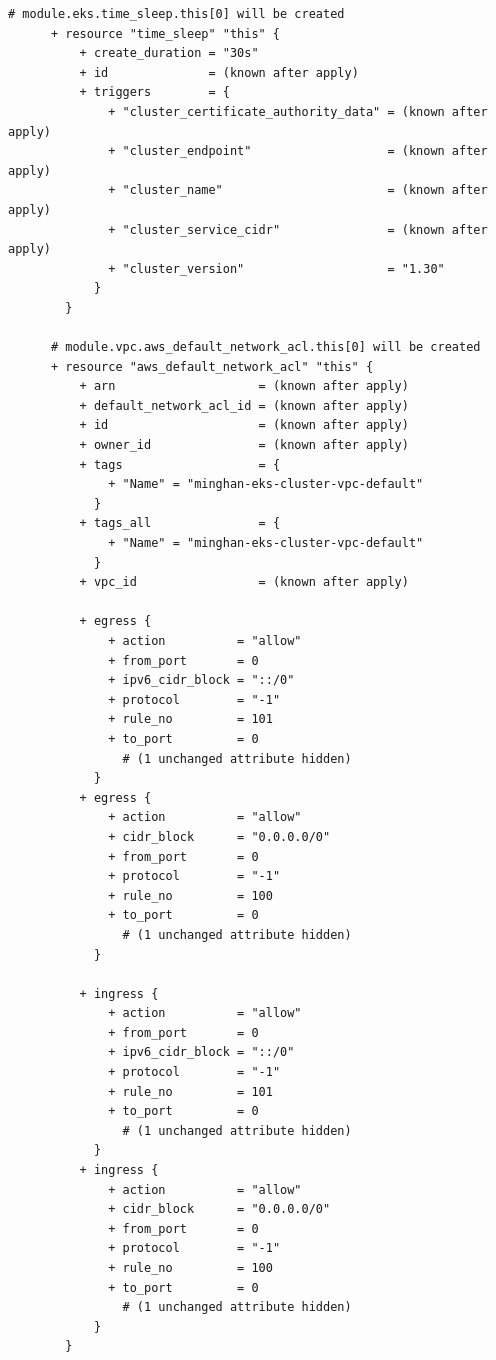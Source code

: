 \begin{lstlisting}[caption={terraform plan output for \texttt{cloudkube} provisioning}, breaklines=true, breakatwhitespace=false]
      # module.eks.time_sleep.this[0] will be created
      + resource "time_sleep" "this" {
          + create_duration = "30s"
          + id              = (known after apply)
          + triggers        = {
              + "cluster_certificate_authority_data" = (known after apply)
              + "cluster_endpoint"                   = (known after apply)
              + "cluster_name"                       = (known after apply)
              + "cluster_service_cidr"               = (known after apply)
              + "cluster_version"                    = "1.30"
            }
        }
    
      # module.vpc.aws_default_network_acl.this[0] will be created
      + resource "aws_default_network_acl" "this" {
          + arn                    = (known after apply)
          + default_network_acl_id = (known after apply)
          + id                     = (known after apply)
          + owner_id               = (known after apply)
          + tags                   = {
              + "Name" = "minghan-eks-cluster-vpc-default"
            }
          + tags_all               = {
              + "Name" = "minghan-eks-cluster-vpc-default"
            }
          + vpc_id                 = (known after apply)
    
          + egress {
              + action          = "allow"
              + from_port       = 0
              + ipv6_cidr_block = "::/0"
              + protocol        = "-1"
              + rule_no         = 101
              + to_port         = 0
                # (1 unchanged attribute hidden)
            }
          + egress {
              + action          = "allow"
              + cidr_block      = "0.0.0.0/0"
              + from_port       = 0
              + protocol        = "-1"
              + rule_no         = 100
              + to_port         = 0
                # (1 unchanged attribute hidden)
            }
    
          + ingress {
              + action          = "allow"
              + from_port       = 0
              + ipv6_cidr_block = "::/0"
              + protocol        = "-1"
              + rule_no         = 101
              + to_port         = 0
                # (1 unchanged attribute hidden)
            }
          + ingress {
              + action          = "allow"
              + cidr_block      = "0.0.0.0/0"
              + from_port       = 0
              + protocol        = "-1"
              + rule_no         = 100
              + to_port         = 0
                # (1 unchanged attribute hidden)
            }
        }
    

\end{lstlisting}
